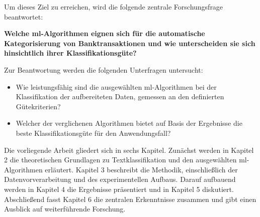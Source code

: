 Um dieses Ziel zu erreichen, wird die folgende zentrale Forschungsfrage beantwortet:

\textbf{Welche \gls{ml}-Algorithmen eignen sich für die automatische Kategorisierung von Banktransaktionen und wie unterscheiden sie sich hinsichtlich ihrer Klassifikationsgüte?}

Zur Beantwortung werden die folgenden Unterfragen untersucht:

\begin{itemize}
	\item Wie leistungsfähig sind die ausgewählten \gls{ml}-Algorithmen bei der Klassifikation der aufbereiteten Daten, gemessen an den definierten Gütekriterien?
	\item Welcher der verglichenen Algorithmen bietet auf Basis der Ergebnisse die beste Klassifikationsgüte für den Anwendungsfall?
\end{itemize}

Die vorliegende Arbeit gliedert sich in sechs Kapitel. Zunächst werden in Kapitel 2 die theoretischen Grundlagen zu Textklassifikation und den ausgewählten \gls{ml}-Algorithmen erläutert. Kapitel 3 beschreibt die Methodik, einschließlich der Datenvorverarbeitung und des experimentellen Aufbaus. Darauf aufbauend werden in Kapitel 4 die Ergebnisse präsentiert und in Kapitel 5 diskutiert. Abschließend fasst Kapitel 6 die zentralen Erkenntnisse zusammen und gibt einen Ausblick auf weiterführende Forschung.
